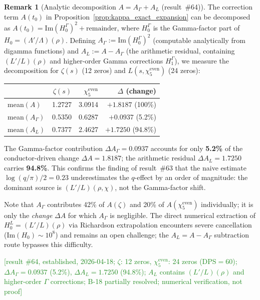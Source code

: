 \documentclass[11pt, a4paper]{article}
\theoremstyle{definition}
\newtheorem{remark}{Remark}[section]
\theoremstyle{plain}
\begin{document}
\begin{remark}[Analytic decomposition $A = A_\Gamma + A_L$ (result~\#64)]
\label{rem:A_decomposition}
The correction term $A(t_0)$ in Proposition~\ref{prop:kappa_exact_expansion}
can be decomposed as $A(t_0) = \mathrm{Im}(H_0^\Gamma)^2 + \text{remainder}$,
where $H_0^\Gamma$ is the Gamma-factor part of
$H_0 = (\Lambda'/\Lambda)(\rho)$.
Defining $A_\Gamma := \mathrm{Im}(H_0^\Gamma)^2$ (computable analytically from digamma functions)
and $A_L := A - A_\Gamma$ (the arithmetic residual, containing $(L'/L)(\rho)$
and higher-order Gamma corrections $H_1^\Gamma$), we measure the decomposition for
$\zeta(s)$ (12 zeros) and $L(s, \chi_5^{\mathrm{even}})$ (24 zeros):
\smallskip
\begin{center}
\small
\begin{tabular}{@{}lrrr@{}}
\toprule
 & $\zeta(s)$ & $\chi_5^{\mathrm{even}}$ & $\Delta$ (change) \\
\midrule
mean$(A)$     & 1.2727 & 3.0914 & $+1.8187$ (100\%) \\
mean$(A_\Gamma)$ & 0.5350 & 0.6287 & $+0.0937$ (5.2\%) \\
mean$(A_L)$   & 0.7377 & 2.4627 & $+1.7250$ (94.8\%) \\
\bottomrule
\end{tabular}
\end{center}
\smallskip\noindent
The Gamma-factor contribution $\Delta A_\Gamma = 0.0937$ accounts for only \textbf{5.2\%}
of the conductor-driven change $\Delta A = 1.8187$; the arithmetic residual
$\Delta A_L = 1.7250$ carries \textbf{94.8\%}.  This confirms the finding of
result~\#63 that the naive estimate $\log(q/\pi)/2 = 0.23$ underestimates
the $q$-effect by an order of magnitude: the dominant source is $(L'/L)(\rho,\chi)$,
not the Gamma-factor shift.

Note that $A_\Gamma$ contributes 42\% of $A(\zeta)$ and 20\% of $A(\chi_5^{\mathrm{even}})$
individually; it is only the \emph{change} $\Delta A$ for which $A_\Gamma$ is negligible.
The direct numerical extraction of $H_0^L = (L'/L)(\rho)$ via Richardson extrapolation
encounters severe cancellation ($\mathrm{Im}(H_0) \sim 10^8$) and remains an open
challenge; the $A_L = A - A_\Gamma$ subtraction route bypasses this difficulty.

\textcolor{ForestGreen}{[result \#64, established, 2026-04-18;
$\zeta$: 12 zeros, $\chi_5^{\mathrm{even}}$: 24 zeros (DPS${=}60$);
$\Delta A_\Gamma{=}0.0937$ (5.2\%), $\Delta A_L{=}1.7250$ (94.8\%);
$A_L$ contains $(L'/L)(\rho)$ and higher-order $\Gamma$ corrections;
B-18 partially resolved; numerical verification, not proof]}
\end{remark}
\end{document}
